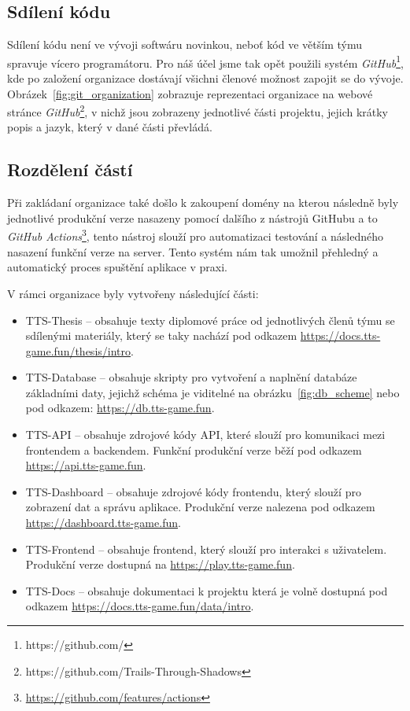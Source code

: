 \subsection{Sdílení kódu}
\label{subsec:implementation-collaboration-sharing}
Sdílení kódu není ve vývoji softwáru novinkou, neboť kód ve větším týmu spravuje vícero programátoru. Pro náš účel jsme tak opět použili systém \textit{GitHub}\footnote{https://github.com/}, kde po založení organizace dostávají všichni členové možnost zapojit se do vývoje. Obrázek~\ref{fig:git_organization} zobrazuje reprezentaci organizace na webové stránce \textit{GitHub}\footnote{https://github.com/Trails-Through-Shadows}, v nichž jsou zobrazeny jednotlivé části projektu, jejich krátky popis a jazyk, který v dané části převládá.

\subsection*{Rozdělení částí}
\label{subsec:implementation-collaboration-sharing-parts}
Při zakládaní organizace také došlo k zakoupení domény na kterou následně byly jednotlivé produkční verze nasazeny pomocí dalšího z nástrojů GitHubu a to \textit{GitHub Actions}\footnote{\href{https://github.com/features/actions}{https://github.com/features/actions}}, tento nástroj slouží pro automatizaci testování a následného nasazení funkční verze na server. Tento systém nám tak umožnil přehledný a automatický proces spuštění aplikace v praxi.

\noindent
V rámci organizace byly vytvořeny následující části:

\begin{itemize}
    \item TTS-Thesis    -- obsahuje texty diplomové práce od jednotlivých členů týmu se sdílenými materiály, který se taky nachází pod odkazem  \url{https://docs.tts-game.fun/thesis/intro}.
    \item TTS-Database  -- obsahuje skripty pro vytvoření a naplnění databáze základními daty, jejichž schéma je viditelné na obrázku~\ref{fig:db_scheme} nebo pod odkazem: \url{https://db.tts-game.fun}.
    \item TTS-API       -- obsahuje zdrojové kódy API, které slouží pro komunikaci mezi frontendem a backendem. Funkční produkční verze běží pod odkazem \url{https://api.tts-game.fun}.
    \item TTS-Dashboard -- obsahuje zdrojové kódy frontendu, který slouží pro zobrazení dat a správu aplikace. Produkční verze nalezena pod odkazem \url{https://dashboard.tts-game.fun}.
    \item TTS-Frontend  -- obsahuje frontend, který slouží pro interakci s uživatelem. Produkční verze dostupná na \url{https://play.tts-game.fun}.
    \item TTS-Docs      -- obsahuje dokumentaci k projektu která je volně dostupná pod odkazem \url{https://docs.tts-game.fun/data/intro}.
\end{itemize}

